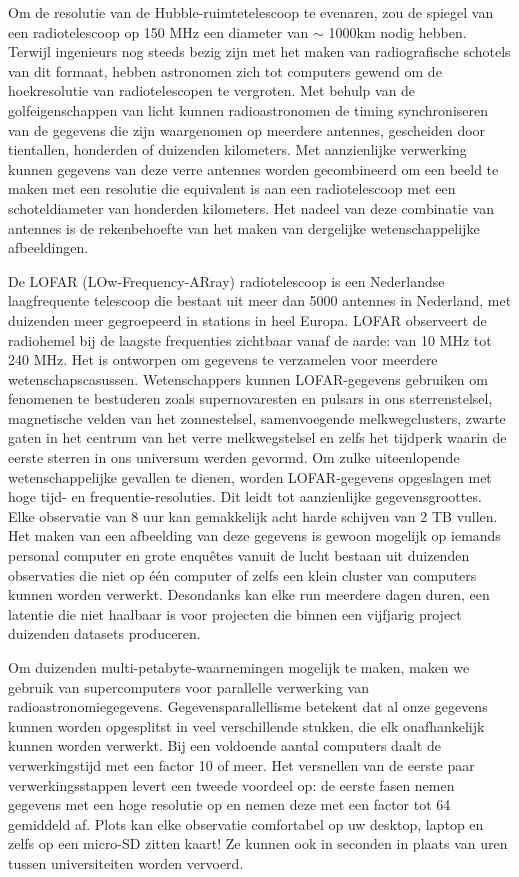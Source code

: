 Om de resolutie van de Hubble-ruimtetelescoop te evenaren, zou de spiegel van een radiotelescoop op 150 MHz een diameter van $\sim$ 1000km nodig hebben. Terwijl ingenieurs nog steeds bezig zijn met het maken van radiografische schotels van dit formaat, hebben astronomen zich tot computers gewend om de hoekresolutie van radiotelescopen te vergroten. Met behulp van de golfeigenschappen van licht kunnen radioastronomen de timing synchroniseren van de gegevens die zijn waargenomen op meerdere antennes, gescheiden door tientallen, honderden of duizenden kilometers. Met aanzienlijke verwerking kunnen gegevens van deze verre antennes worden gecombineerd om een beeld te maken met een resolutie die equivalent is aan een radiotelescoop met een schoteldiameter van honderden kilometers. Het nadeel van deze combinatie van antennes is de rekenbehoefte van het maken van dergelijke wetenschappelijke afbeeldingen.


De LOFAR (LOw-Frequency-ARray) radiotelescoop is een Nederlandse laagfrequente telescoop die bestaat uit meer dan 5000 antennes in Nederland, met duizenden meer gegroepeerd in stations in heel Europa. LOFAR observeert de radiohemel bij de laagste frequenties zichtbaar vanaf de aarde: van 10 MHz tot 240 MHz. Het is ontworpen om gegevens te verzamelen voor meerdere wetenschapscasussen. Wetenschappers kunnen LOFAR-gegevens gebruiken om fenomenen te bestuderen zoals supernovaresten en pulsars in ons sterrenstelsel, magnetische velden van het zonnestelsel, samenvoegende melkwegclusters, zwarte gaten in het centrum van het verre melkwegstelsel en zelfs het tijdperk waarin de eerste sterren in ons universum werden gevormd. Om zulke uiteenlopende wetenschappelijke gevallen te dienen, worden LOFAR-gegevens opgeslagen met hoge tijd- en frequentie-resoluties. Dit leidt tot aanzienlijke gegevensgroottes. Elke observatie van 8 uur kan gemakkelijk acht harde schijven van 2 TB vullen. Het maken van een afbeelding van deze gegevens is gewoon mogelijk op iemands personal computer en grote enquêtes vanuit de lucht bestaan uit duizenden observaties die niet op één computer of zelfs een klein cluster van computers kunnen worden verwerkt. Desondanks kan elke run meerdere dagen duren, een latentie die niet haalbaar is voor projecten die binnen een vijfjarig project duizenden datasets produceren.

Om duizenden multi-petabyte-waarnemingen mogelijk te maken, maken we gebruik van supercomputers voor parallelle verwerking van radioastronomiegegevens. Gegevensparallellisme betekent dat al onze gegevens kunnen worden opgesplitst in veel verschillende stukken, die elk onafhankelijk kunnen worden verwerkt. Bij een voldoende aantal computers daalt de verwerkingstijd met een factor 10 of meer. Het versnellen van de eerste paar verwerkingsstappen levert een tweede voordeel op: de eerste fasen nemen gegevens met een hoge resolutie op en nemen deze met een factor tot 64 gemiddeld af. Plots kan elke observatie comfortabel op uw desktop, laptop en zelfs op een micro-SD zitten kaart! Ze kunnen ook in seconden in plaats van uren tussen universiteiten worden vervoerd.

